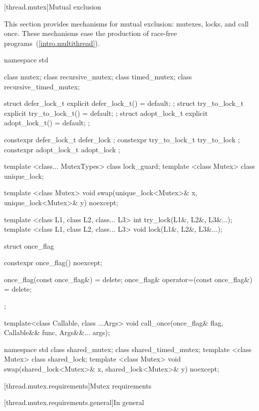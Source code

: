 [thread.mutex]{Mutual exclusion}

\pnum
This section provides mechanisms for mutual exclusion: mutexes, locks, and call
once. These mechanisms ease the production of race-free
programs~(\ref{intro.multithread}).

%

\begin{codeblock}
namespace std {
  class mutex;
  class recursive_mutex;
  class timed_mutex;
  class recursive_timed_mutex;

  struct defer_lock_t { explicit defer_lock_t() = default; };
  struct try_to_lock_t { explicit try_to_lock_t() = default; };
  struct adopt_lock_t { explicit adopt_lock_t() = default; };

  constexpr defer_lock_t  defer_lock { };
  constexpr try_to_lock_t try_to_lock { };
  constexpr adopt_lock_t  adopt_lock { };

  template <class... MutexTypes> class lock_guard;
  template <class Mutex> class unique_lock;

  template <class Mutex>
    void swap(unique_lock<Mutex>& x, unique_lock<Mutex>& y) noexcept;

  template <class L1, class L2, class... L3> int try_lock(L1&, L2&, L3&...);
  template <class L1, class L2, class... L3> void lock(L1&, L2&, L3&...);

  struct once_flag {
    constexpr once_flag() noexcept;

    once_flag(const once_flag&) = delete;
    once_flag& operator=(const once_flag&) = delete;
  };

  template<class Callable, class ...Args>
    void call_once(once_flag& flag, Callable&& func, Args&&... args);
}
\end{codeblock}

%

\begin{codeblock}
namespace std {
  class shared_mutex;
  class shared_timed_mutex;
  template <class Mutex> class shared_lock;
  template <class Mutex>
    void swap(shared_lock<Mutex>& x, shared_lock<Mutex>& y) noexcept;
}
\end{codeblock}

[thread.mutex.requirements]{Mutex requirements}

[thread.mutex.requirements.general]{In general}


